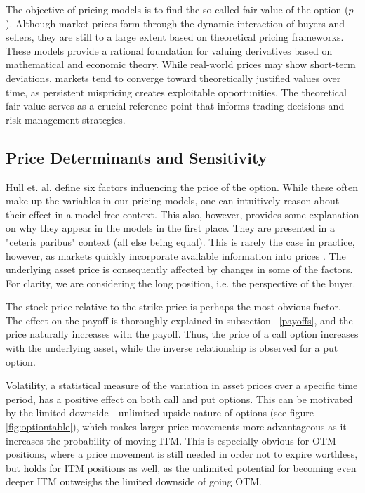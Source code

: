 \documentclass[english,12pt,a4paper,pdftex,sci,utf8]{aaltothesis}
\begin{document}
The objective of pricing models is to find the so-called fair value of the option ($p$). Although market prices form through the dynamic interaction of buyers and sellers, they are still to a large extent based on theoretical pricing frameworks. These models provide a rational foundation for valuing derivatives based on mathematical and economic theory. While real-world prices may show short-term deviations, markets tend to converge toward theoretically justified values over time, as persistent mispricing creates exploitable opportunities. The theoretical fair value serves as a crucial reference point that informs trading decisions and risk management strategies.


\subsection{Price Determinants and Sensitivity}

Hull et. al. \cite{hull2013fundamentals} define six factors influencing the price of the option. While these often make up the variables in our pricing models, one can intuitively reason about their effect in a model-free context. This also, however, provides some explanation on why they appear in the models in the first place. They are presented in a "ceteris paribus" context (all else being equal). This is rarely the case in practice, however, as markets quickly incorporate available information into prices \cite{fama1970efficient}. The underlying asset price is consequently affected by changes in some of the factors. For clarity, we are considering the long position, i.e. the perspective of the buyer.

The stock price relative to the strike price is perhaps the most obvious factor. The effect on the payoff is thoroughly explained in subsection ~\ref{payoffs}, and the price naturally increases with the payoff. Thus, the price of a call option increases with the underlying asset, while the inverse relationship is observed for a put option.

Volatility, a statistical measure of the variation in asset prices over a specific time period, has a positive effect on both call and put options. This can be motivated by the limited downside - unlimited upside nature of options (see figure \ref{fig:optiontable}), which makes larger price movements more advantageous as it increases the probability of moving ITM. This is especially obvious for OTM positions, where a price movement is still needed in order not to expire worthless, but holds for ITM positions as well, as the unlimited potential for becoming even deeper ITM outweighs the limited downside of going OTM.
\end{document}
